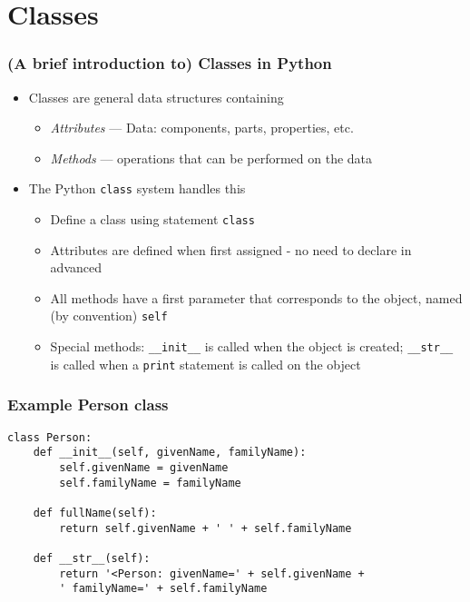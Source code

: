 \section{Classes}

\begin{frame}[fragile]
  \frametitle{(A brief introduction to) Classes in Python}
  
  \begin{itemize}
  \item<1-> Classes are general data structures containing
    \begin{itemize}
    \item \emph{Attributes} --- Data: components, parts, properties, etc. 
    \item \emph{Methods} --- operations that can be performed on the data
    \end{itemize}
  \item<2-> The Python \texttt{class} system handles this
    \begin{itemize}
    \item Define a class using statement \texttt{class}
    \item Attributes are defined when first assigned - no need to
      declare in advanced
    \item All methods have a first parameter that corresponds to the
      object, named (by convention) \texttt{self}
    \item Special methods: \verb+__init__+ is called when the object
      is created;  \verb+__str__+ is called when a \texttt{print}
      statement is called on the object
    \end{itemize}
  \end{itemize}
\end{frame}

\begin{frame}[fragile]
  \frametitle{Example Person class}
{\small
\begin{verbatim}
class Person:
    def __init__(self, givenName, familyName):
        self.givenName = givenName
        self.familyName = familyName

    def fullName(self):
        return self.givenName + ' ' + self.familyName

    def __str__(self):
        return '<Person: givenName=' + self.givenName + 
        ' familyName=' + self.familyName
\end{verbatim}}
  
\end{frame}

